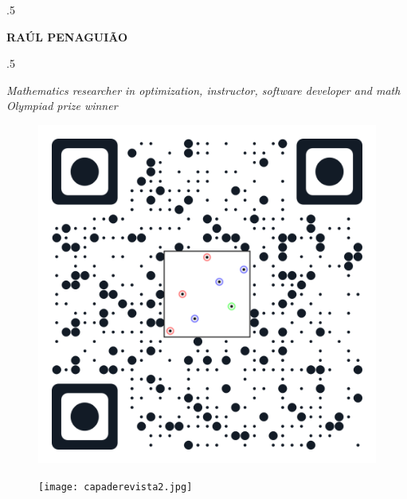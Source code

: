 \documentclass[margin, 10pt]{res} %
\begin{document}

\moveleft.5\hoffset\centerline{{\Huge\bf RA\'UL PENAGUI\~AO}} %
\vspace{1.5mm}
\moveleft.5\hoffset\centerline{{\it Mathematics researcher in optimization, instructor, software developer and math Olympiad prize winner}} %

\begin{figure}
\centering
\begin{minipage}{.5\textwidth}
  \centering
  \includegraphics[width=.4\linewidth, left]{websiteQRcode.png}
\end{minipage}%
\begin{minipage}{.5\textwidth}
  \centering
  \texttt{[image: capaderevista2.jpg]}
\end{minipage}
\end{figure}


 
\end{document}
